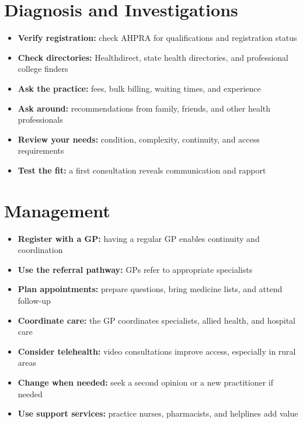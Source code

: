 \section*{Diagnosis and Investigations}
\begin{itemize}
    \item \textbf{Verify registration:} check AHPRA for qualifications and registration status
    \item \textbf{Check directories:} Healthdirect, state health directories, and professional college finders
    \item \textbf{Ask the practice:} fees, bulk billing, waiting times, and experience
    \item \textbf{Ask around:} recommendations from family, friends, and other health professionals
    \item \textbf{Review your needs:} condition, complexity, continuity, and access requirements
    \item \textbf{Test the fit:} a first consultation reveals communication and rapport
\end{itemize}

\section*{Management}
\begin{itemize}
    \item \textbf{Register with a GP:} having a regular GP enables continuity and coordination
    \item \textbf{Use the referral pathway:} GPs refer to appropriate specialists
    \item \textbf{Plan appointments:} prepare questions, bring medicine lists, and attend follow-up
    \item \textbf{Coordinate care:} the GP coordinates specialists, allied health, and hospital care
    \item \textbf{Consider telehealth:} video consultations improve access, especially in rural areas
    \item \textbf{Change when needed:} seek a second opinion or a new practitioner if needed
    \item \textbf{Use support services:} practice nurses, pharmacists, and helplines add value
\end{itemize}

